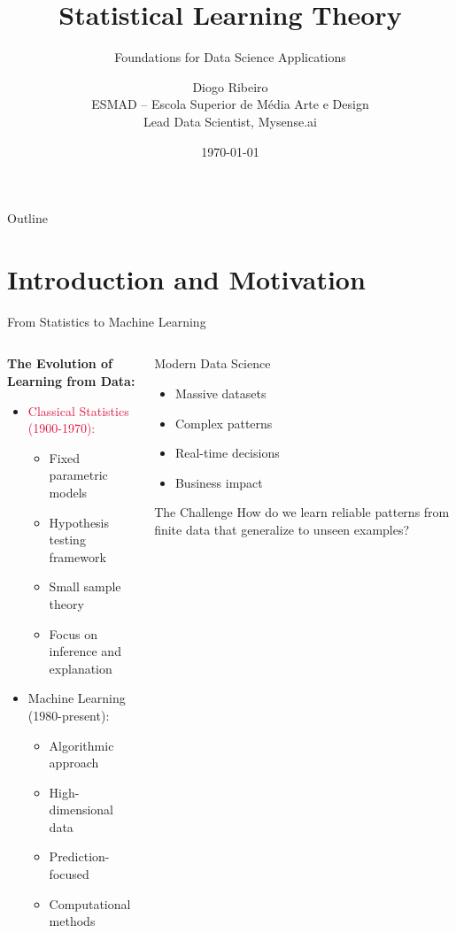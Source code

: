 \documentclass[aspectratio=169,11pt]{beamer}
\title[Statistical Learning Theory]{Statistical Learning Theory}
\subtitle{Foundations for Data Science Applications}
\author[D. Ribeiro]{Diogo Ribeiro\\
\small ESMAD -- Escola Superior de Média Arte e Design\\
\small Lead Data Scientist, Mysense.ai}
\date{\today}
\begin{document}
\begin{frame}
\titlepage
\end{frame}

\begin{frame}{Outline}
\tableofcontents
\end{frame}

\section{Introduction and Motivation}

\begin{frame}{From Statistics to Machine Learning}
\begin{columns}
\begin{column}[t]{0.6\textwidth}
\textbf{The Evolution of Learning from Data:}

\begin{itemize}
\item \textcolor{crimson}{Classical Statistics (1900-1970):}
  \begin{itemize}
  \item Fixed parametric models
  \item Hypothesis testing framework
  \item Small sample theory
  \item Focus on inference and explanation
  \end{itemize}
  
\item \textcolor{forest}{Machine Learning (1980-present):}
  \begin{itemize}
  \item Algorithmic approach
  \item High-dimensional data
  \item Prediction-focused
  \item Computational methods
  \end{itemize}
\end{itemize}
\end{column}
\begin{column}[t]{0.4\textwidth}
\begin{block}{Modern Data Science}
\begin{itemize}
\item Massive datasets
\item Complex patterns
\item Real-time decisions
\item Business impact
\end{itemize}
\end{block}

\begin{alertblock}{The Challenge}
How do we learn reliable patterns from finite data that generalize to unseen examples?
\end{alertblock}
\end{column}
\end{columns}
\end{frame}
\end{document}
